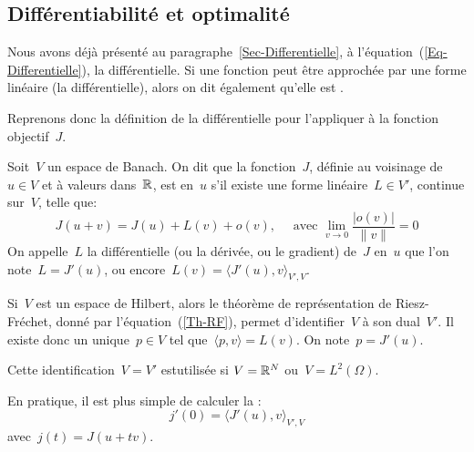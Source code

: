 \medskip
\subsection{Différentiabilité et optimalité}

Nous avons déjà présenté au paragraphe~\ref{Sec-Differentielle}, à l'équation~(\ref{Eq-Differentielle}), la différentielle. Si une fonction peut être approchée par une forme linéaire (la différentielle), alors on dit également qu'elle est .

Reprenons donc la définition de la différentielle pour l'appliquer à la fonction objectif~$J$.
\begin{definition}
Soit~$V$ un espace de Banach. On dit que la fonction~$J$, définie au voisinage de~$u\in V$ et à valeurs dans~$\mathbb R$, est  en~$u$ s'il existe une forme linéaire~$L\in V'$, continue sur~$V$, telle que:
\begin{equation}
J(u+v) = J(u) + L(v) + o(v), \quad \text{ avec } \lim_{v\rightarrow0} \dfrac{|o(v)|}{\|v\|}=0
\end{equation}
On appelle~$L$ la différentielle (ou la dérivée, ou le gradient) de~$J$ en~$u$ que l'on note~$L=J'(u)$, ou encore~$L(v)=\langle J'(u),v\rangle_{V',V}$.
\end{definition}
\begin{remarque}[Remarques]
Si~$V$ est un espace de Hilbert, alors le théorème de représentation de Riesz-Fréchet, donné par l'équation~(\ref{Th-RF}), permet d'identifier~$V$ à son dual~$V'$. Il existe donc un unique~$p\in V$ tel que~$\langle p,v\rangle = L(v)$. On note~$p=J'(u)$.
\par\noindent
Cette identification~$V=V'$ estutilisée si $V=\mathbb R^N$ ou~$V=L^2(\Omega)$.
\par\noindent{}
En pratique, il est plus simple de calculer la :
\begin{equation}
j'(0) = \langle J'(u),v\rangle_{V',V}
\end{equation}
avec~$j(t)=J(u+tv)$.
\end{remarque}

